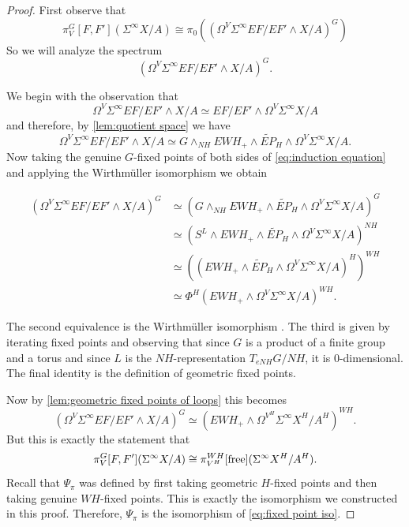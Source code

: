 \documentclass[11pt]{amsart}
\newcommand{\free}{\textup{free}}
\theoremstyle{plain}   %
\theoremstyle{definition}
\theoremstyle{remark}
\numberwithin{equation}{section}
\begin{document}
\begin{proof}
First observe that 
\[
\pi_V^G[F,F'](\Sigma^\infty X/A) \cong \pi_0((\Omega^V\Sigma^\infty EF/EF'\wedge X/A)^G)
\]
So we will analyze the spectrum
\[
(\Omega^V\Sigma^\infty EF/EF'\wedge X/A)^G.
\]

We begin with the observation that 
\[
\Omega^V\Sigma^\infty EF/EF'\wedge X/A \simeq EF/EF'\wedge \Omega^V\Sigma^\infty X/A
\]
and therefore, by \cref{lem:quotient space} we have
\begin{equation}\label{eq:induction equation}
\Omega^V\Sigma^\infty EF/EF'\wedge X/A \simeq G\wedge_{NH}EWH_+\wedge \widetilde{EP}_H\wedge \Omega^V\Sigma^\infty X/A.
\end{equation}
Now taking the genuine $G$-fixed points of both sides of \cref{eq:induction equation} and applying the Wirthm\"uller isomorphism \cite[3.2.15]{schwede_global} we obtain

\begin{align*}
(\Omega^V\Sigma^\infty EF/EF'\wedge X/A)^G
& \simeq (G\wedge_{NH}EWH_+\wedge \widetilde{EP}_H\wedge \Omega^V\Sigma^\infty X/A)^G\\
& \simeq (S^L\wedge EWH_+\wedge \widetilde{EP}_H\wedge\Omega^V\Sigma^\infty X/A)^{NH}\\
& \simeq ((EWH_+\wedge \widetilde{EP}_H\wedge\Omega^V\Sigma^\infty X/A)^H)^{WH}\\
& \simeq \Phi^H(EWH_+\wedge \Omega^V\Sigma^\infty X/A)^{WH}.
\end{align*}

The second equivalence is the Wirthm\"uller isomorphism \cite[3.2.15]{schwede_global}. The third is given by iterating fixed points and observing that since $G$ is a product of a finite group and a torus and since $L$ is the $NH$-representation $T_{eNH}G/NH$, it is 0-dimensional. The final identity is the definition of geometric fixed points. 

Now by \cref{lem:geometric fixed points of loops} this becomes
\[
(\Omega^V\Sigma^\infty EF/EF'\wedge X/A)^G \simeq (EWH_+\wedge\Omega^{V^H}\Sigma^\infty X^H/A^H)^{WH}.
\]
But this is exactly the statement that 
\begin{equation}\label{eq:fixed point iso}
\pi_V^G[F,F'](\Sigma^\infty X/A)\cong \pi_{V^H}^{WH}[\free](\Sigma^\infty X^H/A^H).
\end{equation}
Recall that $\Psi_\pi$ was defined by first taking geometric $H$-fixed points and then taking genuine $WH$-fixed points. This is exactly the isomorphism we constructed in this proof. Therefore, $\Psi_\pi$ is the isomorphism of \cref{eq:fixed point iso}. 
\end{proof}
\end{document}
